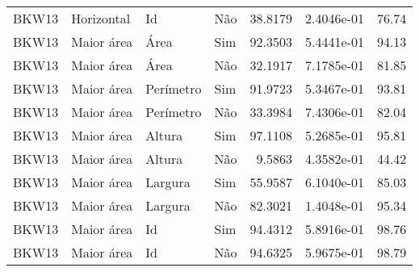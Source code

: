 \begin{tabular}{llllrrr}
BKW13     & Horizontal & Id        & Não         & 38.8179      & 2.4046e-01 & 76.74    \\
BKW13     & Maior área & Área      & Sim         & 92.3503      & 5.4441e-01 & 94.13    \\
BKW13     & Maior área & Área      & Não         & 32.1917      & 7.1785e-01 & 81.85    \\
BKW13     & Maior área & Perímetro & Sim         & 91.9723      & 5.3467e-01 & 93.81    \\
BKW13     & Maior área & Perímetro & Não         & 33.3984      & 7.4306e-01 & 82.04    \\
BKW13     & Maior área & Altura    & Sim         & 97.1108      & 5.2685e-01 & 95.81    \\
BKW13     & Maior área & Altura    & Não         & 9.5863       & 4.3582e-01 & 44.42    \\
BKW13     & Maior área & Largura   & Sim         & 55.9587      & 6.1040e-01 & 85.03    \\
BKW13     & Maior área & Largura   & Não         & 82.3021      & 1.4048e-01 & 95.34    \\
BKW13     & Maior área & Id        & Sim         & 94.4312      & 5.8916e-01 & 98.76    \\
BKW13     & Maior área & Id        & Não         & 94.6325      & 5.9675e-01 & 98.79    \\
\hline
\end{tabular}